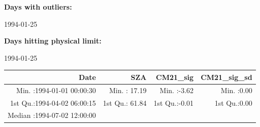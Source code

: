 \documentclass[
  10pt,
  a4paper,oneside]{article}
\begin{document}
\normalsize

\textbf{Days with outliers:}

1994-01-25

\textbf{Days hitting physical limit:}

1994-01-25

\footnotesize

\begin{longtable}[]{@{}rrrr@{}}
\toprule
\begin{minipage}[b]{0.34\columnwidth}\raggedleft
Date\strut
\end{minipage} & \begin{minipage}[b]{0.19\columnwidth}\raggedleft
SZA\strut
\end{minipage} & \begin{minipage}[b]{0.18\columnwidth}\raggedleft
CM21\_sig\strut
\end{minipage} & \begin{minipage}[b]{0.18\columnwidth}\raggedleft
CM21\_sig\_sd\strut
\end{minipage}\tabularnewline
\midrule
\endhead
\begin{minipage}[t]{0.34\columnwidth}\raggedleft
Min. :1994-01-01 00:00:30\strut
\end{minipage} & \begin{minipage}[t]{0.19\columnwidth}\raggedleft
Min. : 17.19\strut
\end{minipage} & \begin{minipage}[t]{0.18\columnwidth}\raggedleft
Min. :-3.62\strut
\end{minipage} & \begin{minipage}[t]{0.18\columnwidth}\raggedleft
Min. :0.00\strut
\end{minipage}\tabularnewline
\begin{minipage}[t]{0.34\columnwidth}\raggedleft
1st Qu.:1994-04-02 06:00:15\strut
\end{minipage} & \begin{minipage}[t]{0.19\columnwidth}\raggedleft
1st Qu.: 61.84\strut
\end{minipage} & \begin{minipage}[t]{0.18\columnwidth}\raggedleft
1st Qu.:-0.01\strut
\end{minipage} & \begin{minipage}[t]{0.18\columnwidth}\raggedleft
1st Qu.:0.00\strut
\end{minipage}\tabularnewline
\begin{minipage}[t]{0.34\columnwidth}\raggedleft
Median :1994-07-02 12:00:00\strut

\end{minipage}
\end{longtable}
\end{document}
